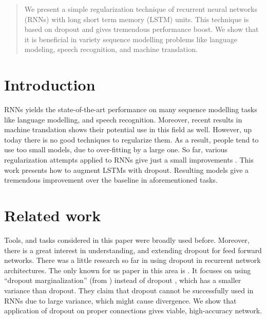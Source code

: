 \documentclass{article}
\begin{document}
 


\begin{abstract} 
  We present a simple regularization technique of recurrent neural networks (RNNs)
  with long short term memory (LSTM) units.
  This technique is based on dropout and gives tremendous performance boost.
  We show that it is beneficial in variety sequence modelling problems like
  language modeling, speech recognition, and machine translation.

\end{abstract} 

\section{Introduction}
RNNs yields the state-of-the-art performance on many sequence modelling
tasks like language modelling, and speech recognition. Moreover, recent results in 
machine translation \cite{cho2014learning} shows their potential use in this field as well. 
However, up today there is no good techniques to regularize them. As a result, people tend to use
too small models, due to over-fitting by a large one.
So far, various regularization attempts applied to RNNs give just a small improvements \cite{graves2013generating}. 
This work presents
how to augment LSTMs with dropout.
Resulting models give a tremendous 
improvement over the baseline in aforementioned tasks.

\section{Related work}
Tools, and tasks considered in this paper were broadly used before. Moreover, there is a great
interest in understanding\cite{warde2013empirical, srivastava2013improving}, and extending dropout \cite{wang2013fast, wan2013regularization} 
for feed forward networks. There was a little
research so far in using dropout in recurrent network architectures. The only known for us paper in this area is
\cite{bayer2013fast}. It focuses on using ``dropout marginalization'' (from \cite{wang2013fast}) instead of dropout
, which has a smaller variance than dropout. They claim that dropout cannot be successfully used in RNNs due to
large variance, which might cause divergence. We show that application of dropout on proper connections gives 
viable, high-accuracy network.
\end{document}
